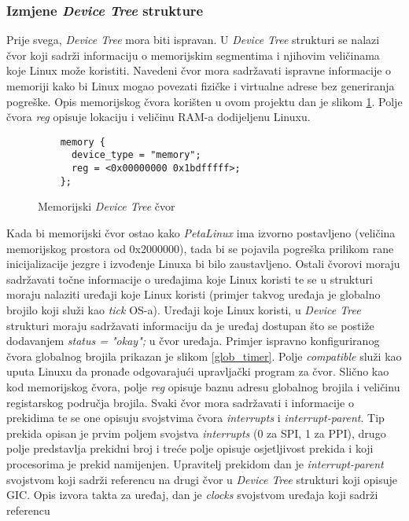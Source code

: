 \documentclass[times, utf8, diplomski, numeric]{fer}
\begin{document}
\subsubsection{Izmjene \textit{Device Tree} strukture}
Prije svega, \textit{Device Tree} mora biti ispravan. U \textit{Device Tree} strukturi se nalazi čvor koji sadrži informaciju
o memorijskim segmentima i njihovim veličinama koje Linux može koristiti. Navedeni čvor mora sadržavati ispravne informacije
o memoriji kako bi Linux mogao povezati fizičke i virtualne adrese bez generiranja pogreške. Opis memorijskog čvora korišten
u ovom projektu dan je slikom \ref{mem_node}. Polje čvora \textit{reg} opisuje lokaciju i veličinu RAM-a dodijeljenu Linuxu.
\begin{figure}[H]
  \lstset{xleftmargin=.1\textwidth}
  \begin{lstlisting}
    memory {
      device_type = "memory";
      reg = <0x00000000 0x1bdfffff>;
    };
  \end{lstlisting}
  \caption{Memorijski \textit{Device Tree} čvor}
  \label{mem_node}
\end{figure}
Kada bi memorijski čvor ostao kako \textit{PetaLinux} ima izvorno postavljeno (veličina memorijskog prostora od 0x2000000),
tada bi se pojavila pogreška prilikom rane inicijalizacije jezgre i izvođenje Linuxa bi bilo zaustavljeno.
Ostali čvorovi moraju sadržavati
točne informacije o uređajima koje Linux koristi te se u strukturi moraju nalaziti uređaji koje Linux koristi (primjer takvog
uređaja je globalno brojilo koji služi kao \textit{tick} OS-a). Uređaji koje Linux koristi, u \textit{Device Tree} strukturi moraju sadržavati informaciju da
je uređaj dostupan što se postiže dodavanjem \textit{status = "okay";} u čvor uređaja. Primjer ispravno konfiguriranog čvora
globalnog brojila prikazan je slikom \ref{glob_timer}. Polje \textit{compatible} služi kao uputa Linuxu da pronađe odgovarajući
upravljački program za čvor. Slično kao kod memorijskog čvora, polje \textit{reg} opisuje baznu adresu globalnog brojila i
veličinu registarskog područja brojila. Svaki čvor mora sadržavati i informacije o prekidima te se one opisuju svojstvima
čvora \textit{interrupts} i \textit{interrupt-parent}. Tip prekida opisan je prvim poljem svojstva \textit{interrupts} (0 za
SPI, 1 za PPI), drugo polje predstavlja prekidni broj i treće polje opisuje osjetljivost prekida i koji procesorima je prekid
namijenjen. Upravitelj prekidom dan je \textit{interrupt-parent} svojstvom koji sadrži referencu na drugi čvor u \textit{Device
Tree} strukturi koji opisuje GIC. Opis izvora takta za uređaj, dan je \textit{clocks} svojstvom uređaja koji sadrži referencu
\end{document}
